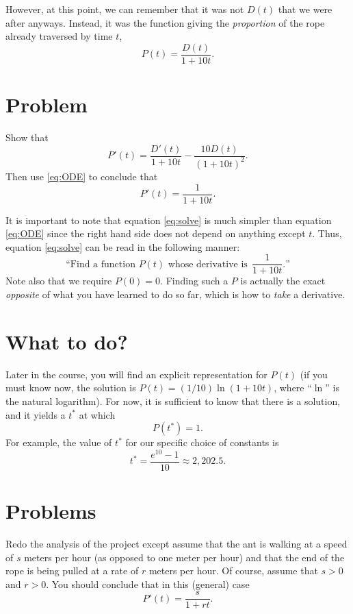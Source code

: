 However, at this point, we can remember that it was not $D(t)$ that we
were after anyways.  Instead, it was the function giving the
\textit{proportion} of the rope already traversed by time $t$,
\[
P(t) = \frac{D(t)}{1 + 10 t}.
\]

\section{Problem}
\problemfont
\problem Show that
\[
P'(t) = \frac{D'(t)}{1 + 10 t} - \frac{10 D(t)}{(1 + 10t)^2}.
\]
Then use \eqref{eq:ODE} to conclude that
\begin{equation}\label{eq:solve}
  P'(t) = \frac{1}{1 + 10 t}.
\end{equation}
\noproblemfont
\bigskip

It is important to note that equation \eqref{eq:solve} is much simpler
than equation \eqref{eq:ODE} since the right hand side does not depend
on anything except $t$.  Thus, equation \eqref{eq:solve} can be read
in the following manner:
\[
\text{``Find a function $P(t)$ whose derivative is} \ \ \frac{1}{1 +
  10 t}\text{.''}
\]
Note also that we require $P(0) = 0$.  Finding such a $P$ is actually
the exact \textit{opposite} of what you have learned to do so far,
which is how to \textit{take} a derivative.
 
 
 
\section{What to do?}

Later in the course, you will find an explicit representation for
$P(t)$ (if you must know now, the solution is $P(t) = (1/10) \ln(1 +
10 t)$, where ``$\ln$'' is the natural logarithm).  For now, it is
sufficient to know that there is a solution, and it yields a $t^*$ at
which
\[
P(t^*) = 1.
\]
For example, the value of $t^*$ for our specific choice of constants
is
\[
t^* = \frac{e^{10} - 1}{10} \approx 2,202.5.
\]


\section{Problems}
\problemfont
\problem Redo the analysis of the project except assume that the ant
is walking at a speed of $s$ meters per hour (as opposed to one meter
per hour) and that the end of the rope is being pulled at a rate of
$r$ meters per hour.  Of course, assume that $s>0$ and $r>0$.  You
should conclude that in this (general) case
\[
P'(t) = \frac{s}{1 + rt}.
\]


